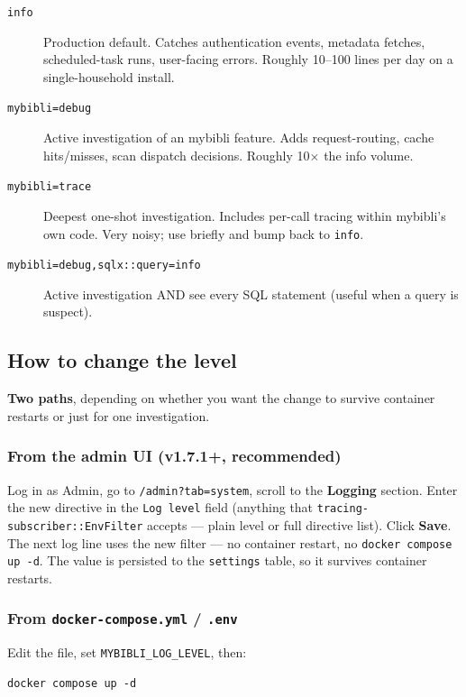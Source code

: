 \begin{description}
  \item[\texttt{info}] Production default. Catches authentication
        events, metadata fetches, scheduled-task runs, user-facing
        errors. Roughly 10--100 lines per day on a single-household
        install.
  \item[\texttt{mybibli=debug}] Active investigation of an mybibli
        feature. Adds request-routing, cache hits/misses, scan
        dispatch decisions. Roughly 10$\times$ the info volume.
  \item[\texttt{mybibli=trace}] Deepest one-shot investigation.
        Includes per-call tracing within mybibli's own code. Very
        noisy; use briefly and bump back to \texttt{info}.
  \item[\texttt{mybibli=debug,sqlx::query=info}] Active investigation
        AND see every SQL statement (useful when a query is suspect).
\end{description}

\subsection*{How to change the level}

\textbf{Two paths}, depending on whether you want the change to
survive container restarts or just for one investigation.

\subsubsection*{From the admin UI (v1.7.1+, recommended)}

Log in as Admin, go to \texttt{/admin?tab=system}, scroll to the
\textbf{Logging} section. Enter the new directive in the
\texttt{Log level} field (anything that
\texttt{tracing-subscriber::EnvFilter} accepts \string— plain
level or full directive list). Click \textbf{Save}. The next log
line uses the new filter \string— no container restart, no
\texttt{docker compose up -d}. The value is persisted to the
\texttt{settings} table, so it survives container restarts.

\subsubsection*{From \texttt{docker-compose.yml} / \texttt{.env}}

Edit the file, set \texttt{MYBIBLI\_LOG\_LEVEL}, then:

\begin{lstlisting}
docker compose up -d
\end{lstlisting}

